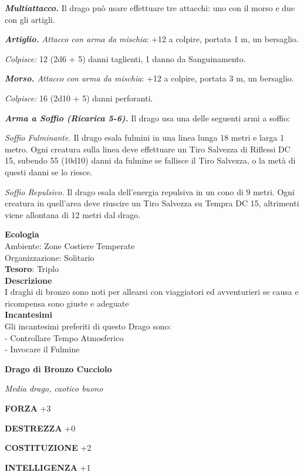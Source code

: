 \begin{multicols}{2}
	\textit{\textbf{Multiattacco.}} Il drago può usare effettuare tre attacchi: uno con il morso e due con gli artigli.

	\textit{\textbf{Artiglio.} Attacco con arma da mischia}: +12 a colpire, portata 1 m, un bersaglio.

	\textit{Colpisce:} 12 (2d6 + 5) danni taglienti, 1 danno da Sanguinamento.

	\textit{\textbf{Morso.} Attacco con arma da mischia}: +12 a colpire, portata 3 m, un bersaglio.

	\textit{Colpisce:} 16 (2d10 + 5) danni perforanti.

	\textit{\textbf{Arma a Soffio (Ricarica 5-6).}} Il drago usa una delle seguenti armi a soffio:

	\textit{Soffio Fulminante.} Il drago esala fulmini in una linea lunga 18 metri e larga 1 metro. Ogni creatura sulla linea deve effettuare un Tiro Salvezza di Riflessi DC 15, subendo 55 (10d10) danni da fulmine se fallisce il Tiro Salvezza, o la metà di questi danni se lo riesce.

	\textit{Soffio Repulsivo.} Il drago esala dell'energia repulsiva in un cono di 9 metri. Ogni creatura in quell'area deve riuscire un Tiro Salvezza su Tempra DC 15, altrimenti viene allontana di 12 metri dal drago.

	\textbf{Ecologia}\\
	Ambiente: Zone Costiere Temperate\\
	Organizzazione: Solitario\\
	\textbf{Tesoro}: Triplo\\
	\textbf{Descrizione}\\
	I draghi di bronzo sono noti per allearsi con viaggiatori ed avventurieri se causa e ricompensa sono giuste e adeguate\\
	\textbf{Incantesimi}\\
	Gli incantesimi preferiti di questo Drago sono:\\
	- Controllare Tempo Atmosferico\\
	- Invocare il Fulmine


	\medskip{}\textbf{Drago di Bronzo Cucciolo}

	\textit{Media drago, caotico buono}

	\textbf{FORZA} +3

	\textbf{DESTREZZA} +0

	\textbf{COSTITUZIONE} +2

	\textbf{INTELLIGENZA} +1


\end{multicols}
